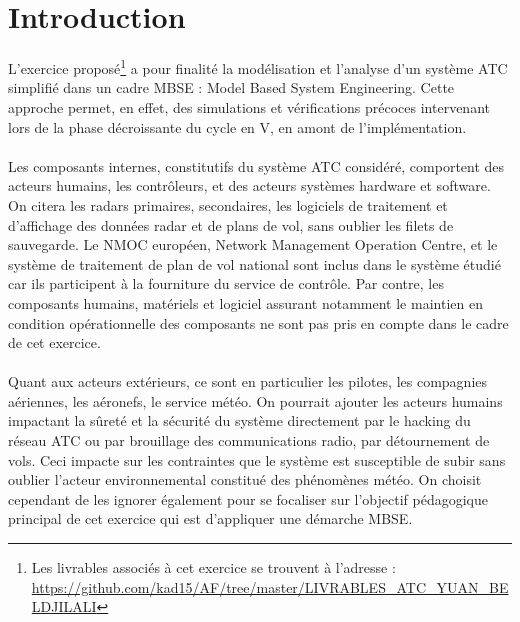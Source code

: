 
\pagebreak

\section*{Introduction}



L'exercice proposé\footnote{Les livrables associés à cet exercice se trouvent à l'adresse : 
	\url{https://github.com/kad15/AF/tree/master/LIVRABLES_ATC_YUAN_BELDJILALI}} a pour finalité la modélisation et l'analyse d'un système ATC simplifié dans un cadre MBSE : Model Based System Engineering. Cette approche permet, en effet, des simulations et vérifications précoces intervenant lors de la phase décroissante du cycle en V, en amont de l'implémentation.   



\paragraph{}
Les composants internes, constitutifs du système ATC considéré, comportent des acteurs humains, les contrôleurs, et des acteurs systèmes hardware et software. On citera les radars primaires, secondaires, les logiciels de traitement et d'affichage des données radar et de plans de vol, sans oublier les filets de sauvegarde. Le NMOC européen, Network Management Operation Centre, et le système de traitement de plan de vol national sont inclus dans le système étudié car ils participent à la fourniture du service de contrôle. Par contre, les composants humains, matériels et logiciel assurant notamment le maintien en condition opérationnelle des composants ne sont pas pris en compte dans le cadre de cet exercice.
\paragraph{}
Quant aux acteurs extérieurs, ce sont en particulier les pilotes, les compagnies aériennes, les aéronefs, le service météo. On pourrait ajouter les acteurs humains impactant la sûreté et la sécurité du système directement par le hacking du réseau ATC ou par brouillage des communications radio, par détournement de vols. Ceci impacte sur les contraintes que le système est susceptible de subir sans oublier l'acteur environnemental constitué des phénomènes météo. On choisit cependant de les ignorer également pour se focaliser sur l'objectif pédagogique principal de cet exercice qui est d'appliquer une démarche MBSE.







